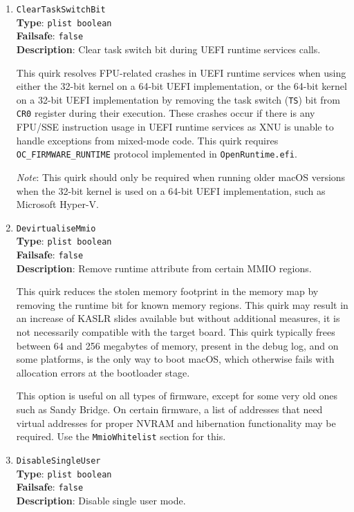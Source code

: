 \documentclass[]{article}
\begin{document}
\begin{enumerate}
  \emph{Note}: Most types of firmware, apart from Apple and VMware, need this quirk.

\item
  \texttt{ClearTaskSwitchBit}\\
  \textbf{Type}: \texttt{plist\ boolean}\\
  \textbf{Failsafe}: \texttt{false}\\
  \textbf{Description}: Clear task switch bit during UEFI runtime services calls.

  This quirk resolves FPU-related crashes in UEFI runtime services when using either the
  32-bit kernel on a 64-bit UEFI implementation, or the 64-bit kernel on a 32-bit UEFI implementation
  by removing the task switch (\texttt{TS}) bit from \texttt{CR0} register during their execution.
  These crashes occur if there is any FPU/SSE instruction usage in UEFI runtime services as XNU
  is unable to handle exceptions from mixed-mode code. This quirk requires \texttt{OC\_FIRMWARE\_RUNTIME}
  protocol implemented in \texttt{OpenRuntime.efi}.

  \emph{Note}: This quirk should only be required when running older macOS versions when the
  32-bit kernel is used on a 64-bit UEFI implementation, such as Microsoft Hyper-V.

\item
  \texttt{DevirtualiseMmio}\\
  \textbf{Type}: \texttt{plist\ boolean}\\
  \textbf{Failsafe}: \texttt{false}\\
  \textbf{Description}: Remove runtime attribute from certain MMIO regions.

  This quirk reduces the stolen memory footprint in the memory map by removing
  the runtime bit for known memory regions. This quirk may result in an increase
  of KASLR slides available but without additional measures, it is not necessarily
  compatible with the target board. This quirk typically frees between 64 and 256
  megabytes of memory, present in the debug log, and on some platforms, is the only way
  to boot macOS, which otherwise fails with allocation errors at the bootloader stage.

  This option is useful on all types of firmware, except for some very old
  ones such as Sandy Bridge. On certain firmware, a list of addresses that need
  virtual addresses for proper NVRAM and hibernation functionality may be required.
  Use the \texttt{MmioWhitelist} section for this.

\item
  \texttt{DisableSingleUser}\\
  \textbf{Type}: \texttt{plist\ boolean}\\
  \textbf{Failsafe}: \texttt{false}\\
  \textbf{Description}: Disable single user mode.


\end{enumerate}
\end{document}
